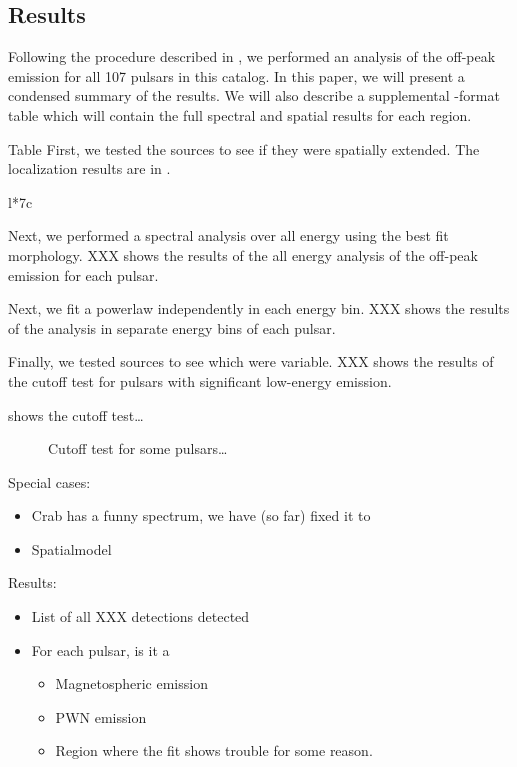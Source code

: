 \subsection{Results}

Following the procedure described in ,
we performed an analysis of the off-peak emission for all 107
pulsars in this catalog. In this paper, we will present
a condensed summary of the results. We will also
describe a supplemental \fits-format table which will contain
the full spectral and spatial results for each region.

Table 
First, we tested the sources to see if they
were spatially extended. The localization results are in .

\begin{deluxetable}{l*{7}c}
\tabletypesize{\scriptsize}

\end{deluxetable}



Next, we performed a spectral analysis over all energy using the best
fit morphology. XXX shows the results of the all energy
analysis of the off-peak emission for each pulsar.

Next, we fit a powerlaw independently in each energy
bin. XXX shows the results of the analysis in separate
energy bins of each pulsar.

Finally, we tested sources to see which were
variable. XXX shows the results of the cutoff test for
pulsars with significant low-energy emission.





 shows the cutoff test\ldots

\begin{figure}
  \ifdefined\bwfigures
  \else
  \fi
  \caption{Cutoff test for some pulsars\dots}
  \label{fig:cutoff_test}
\end{figure}




Special cases:
\begin{itemize}
  \item Crab has a funny spectrum, we have (so far) fixed it to
  \item \velax Spatialmodel
\end{itemize}


Results:
\begin{itemize}
  \item List of all XXX detections detected
  \item For each pulsar, is it a 
    \begin{itemize}
      \item Magnetospheric emission
      \item PWN emission
      \item Region where the fit shows trouble for some reason.
    \end{itemize}
\end{itemize}

